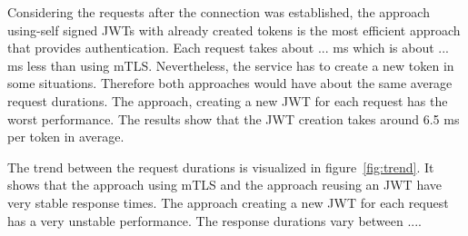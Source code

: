 
Considering the requests after the connection was established, the approach using-self signed JWTs with already created tokens is the most efficient approach that provides authentication.
Each request takes about ... ms which is about ... ms less than using mTLS.
Nevertheless, the service has to create a new token in some situations. 
Therefore both approaches would have about the same average request durations.
The approach, creating a new JWT for each request has the worst performance.
The results show that the JWT creation takes around 6.5 ms per token in average.

The trend between the request durations is visualized in figure~\ref{fig:trend}.
It shows that the approach using mTLS and the approach reusing an JWT have very stable response times.
The approach creating a new JWT for each request has a very unstable performance.
The response durations vary between ....

